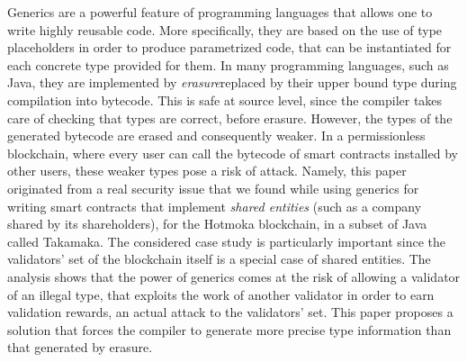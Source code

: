 Generics are a powerful feature of programming languages that allows one
to write highly reusable code.
%
More specifically, they are based on the use of type placeholders in order
to produce parametrized code, that can be instantiated for each
concrete type provided for them. 
%
In many programming languages, such as Java, they are implemented by
\emph{erasure}\ie replaced by their upper bound type during compilation into bytecode.
This is safe at source level, since the compiler takes care of checking that
types are correct, before erasure. However, the types of the generated bytecode
are erased and consequently weaker. In a permissionless blockchain, where
every user can call the bytecode of smart contracts installed by other users,
these weaker types pose a risk of attack.
%
Namely, this paper originated from a real security issue that we found
while using generics for writing
smart contracts that implement
\emph{shared entities} (such as a company shared by its shareholders),
for the Hotmoka blockchain, in a subset of Java called Takamaka.
%
The considered case study is particularly important since
the validators' set of the blockchain itself is
a special case of shared entities.
The analysis shows that the power of generics comes at the risk of
allowing a validator of an illegal type, that exploits the work of another
validator in order to earn validation rewards, an actual attack
to the validators' set. This paper proposes a solution
that forces the compiler to generate more precise type information than
that generated by erasure.
